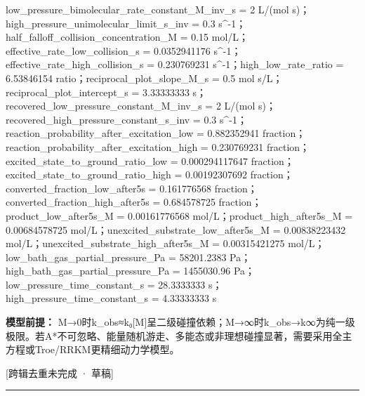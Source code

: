 \documentclass[UTF8,11pt,a4paper]{ctexart}
\begin{document}
low\_pressure\_bimolecular\_rate\_constant\_M\_inv\_s = 2 L/(mol s)；high\_pressure\_unimolecular\_limit\_s\_inv = 0.3 s\textasciicircum{}-1；half\_falloff\_collision\_concentration\_M = 0.15 mol/L；effective\_rate\_low\_collision\_s = 0.0352941176 s\textasciicircum{}-1；effective\_rate\_high\_collision\_s = 0.230769231 s\textasciicircum{}-1；high\_low\_rate\_ratio = 6.53846154 ratio；reciprocal\_plot\_slope\_M\_s = 0.5 mol s/L；reciprocal\_plot\_intercept\_s = 3.33333333 s；recovered\_low\_pressure\_constant\_M\_inv\_s = 2 L/(mol s)；recovered\_high\_pressure\_constant\_s\_inv = 0.3 s\textasciicircum{}-1；reaction\_probability\_after\_excitation\_low = 0.882352941 fraction；reaction\_probability\_after\_excitation\_high = 0.230769231 fraction；excited\_state\_to\_ground\_ratio\_low = 0.000294117647 fraction；excited\_state\_to\_ground\_ratio\_high = 0.00192307692 fraction；converted\_fraction\_low\_after5s = 0.161776568 fraction；converted\_fraction\_high\_after5s = 0.684578725 fraction；product\_low\_after5s\_M = 0.00161776568 mol/L；product\_high\_after5s\_M = 0.00684578725 mol/L；unexcited\_substrate\_low\_after5s\_M = 0.00838223432 mol/L；unexcited\_substrate\_high\_after5s\_M = 0.00315421275 mol/L；low\_bath\_gas\_partial\_pressure\_Pa = 58201.2383 Pa；high\_bath\_gas\_partial\_pressure\_Pa = 1455030.96 Pa；low\_pressure\_time\_constant\_s = 28.3333333 s；high\_pressure\_time\_constant\_s = 4.33333333 s\par
\noindent\textbf{模型前提：}
M→0时k\_obs≈k₀[M]呈二级碰撞依赖；M→∞时k\_obs→k∞为纯一级极限。若A*不可忽略、能量随机游走、多能态或非理想碰撞显著，需要采用全主方程或Troe/RRKM更精细动力学模型。\par
\noindent\textcolor{red!65!black}{[跨辑去重未完成 · 草稿]} \par
\medskip\hrule\medskip
{}
\end{document}
